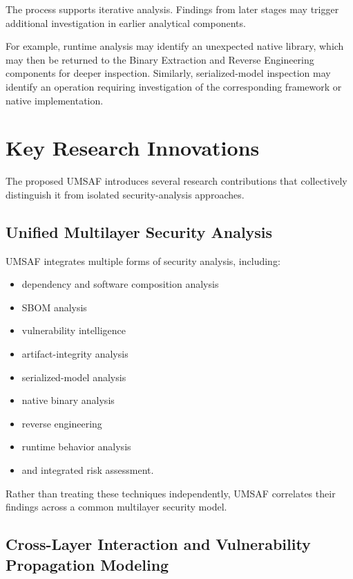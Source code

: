 \documentclass[
  12pt,
  letterpaper,
  oneside]{report}
\providecommand{\tightlist}{%
  \setlength{\itemsep}{0pt}\setlength{\parskip}{0pt}}
\begin{document}
The process supports iterative analysis. Findings from later stages may
trigger additional investigation in earlier analytical components.

For example, runtime analysis may identify an unexpected native library,
which may then be returned to the Binary Extraction and Reverse
Engineering components for deeper inspection. Similarly,
serialized-model inspection may identify an operation requiring
investigation of the corresponding framework or native implementation.

\section{Key Research Innovations}\label{105-key-research-innovations}

The proposed UMSAF introduces several research contributions that
collectively distinguish it from isolated security-analysis approaches.

\subsection{Unified Multilayer Security Analysis}\label{1051-unified-multilayer-security-analysis}

UMSAF integrates multiple forms of security analysis, including:

\begin{itemize}
\tightlist
\item
  dependency and software composition analysis
\item
  SBOM analysis
\item
  vulnerability intelligence
\item
  artifact-integrity analysis
\item
  serialized-model analysis
\item
  native binary analysis
\item
  reverse engineering
\item
  runtime behavior analysis
\item
  and integrated risk assessment.
\end{itemize}

Rather than treating these techniques independently, UMSAF correlates
their findings across a common multilayer security model.

\subsection{Cross-Layer Interaction and Vulnerability Propagation Modeling}\label{1052-cross-layer-interaction-and-vulnerability-propagation-modeling}
\end{document}
